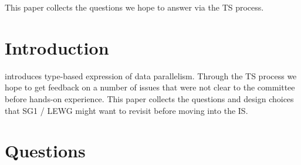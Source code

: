 \newcommand\wgTitle{Expected Feedback from \code{simd} in the Parallelism TS 2}
\newcommand\wgName{Matthias Kretz <m.kretz@gsi.de>}
\newcommand\wgDocumentNumber{DXXXXR0}
\newcommand\wgGroup{SG1 / LEWG}

\usepackage{mymacros}
\usepackage{wg21}
\usepackage{underscore}



\newcommand\simd[1][]{\type{simd#1}\xspace}
\newcommand\simdT{\type{simd<T>}\xspace}
\newcommand\valuetype{\type{value\_type}\xspace}
\newcommand\referencetype{\type{reference}\xspace}
\newcommand\whereexpression{\type{where\_expression}\xspace}
\newcommand\simdcast{\code{simd\_cast}\xspace}
\newcommand\mask[1][]{\type{simd\_mask#1}\xspace}
\newcommand\maskT{\type{simd\_mask<T>}\xspace}
\newcommand\fixedsizeN{\type{simd\_abi::fixed\_size<N>}\xspace}
\newcommand\fixedsizescoped{\type{simd\_abi::fixed\_size}\xspace}
\newcommand\fixedsize{\type{fixed\_size}\xspace}
\newcommand\simdEP{\code{execution::}\type{simd}\xspace}
\newcommand\seqEP{\code{execution::}\type{seq}\xspace}

\usepackage{pifont}

\newcommand\chck{\item[\color{black}\ensuremath{\checkmark}]}
\newcommand\todo{\item[\color{black}\ding{46}] \color{gray}}
\newcommand\itemheader[1]{\item[] \hfill \textcolor{gray}{\textsc{#1}}}


\begin{wgTitlepage}
  This paper collects the questions we hope to answer via the TS process.
\end{wgTitlepage}

\pagestyle{scrheadings}
\section{Introduction}
\cite{N4744} introduces type-based expression of data parallelism.
Through the TS process we hope to get feedback on a number of issues that were not clear to the committee before hands-on experience.
This paper collects the questions and design choices that SG1 / LEWG might want to revisit before moving \simdT into the IS.

\section{Questions}

